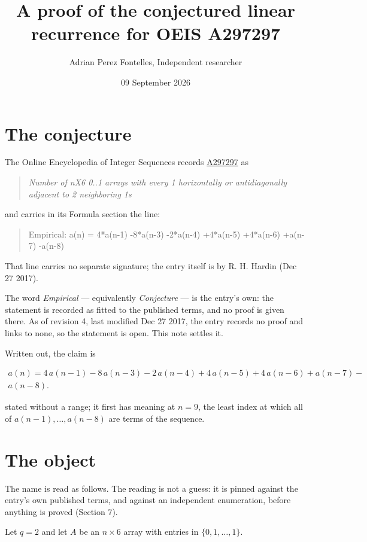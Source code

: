 \documentclass[11pt]{article}
\title{A proof of the conjectured linear recurrence for OEIS A297297}
\author{Adrian Perez Fontelles, Independent researcher}
\date{09 September 2026}
\theoremstyle{definition}
\begin{document}
\maketitle
\section{The conjecture}

The Online Encyclopedia of Integer Sequences records \href{https://oeis.org/A297297}{A297297} as

\begin{quote}\itshape Number of nX6 0..1 arrays with every 1 horizontally or antidiagonally adjacent to 2 neighboring 1s\end{quote}

and carries in its Formula section the line:

\begin{quote}\ttfamily Empirical: a(n) = 4*a(n-1) -8*a(n-3) -2*a(n-4) +4*a(n-5) +4*a(n-6) +a(n-7) -a(n-8)\end{quote}

That line carries no separate signature; the entry itself is by R. H. Hardin (Dec 27 2017).

The word {\itshape Empirical} --- equivalently {\itshape Conjecture} --- is the entry's own: the statement is recorded as fitted to the published terms, and no proof is given there. As of revision 4, last modified Dec 27 2017, the entry records no proof and links to none, so the statement is open. This note settles it.

Written out, the claim is

\begin{multline*} a(n) = 4\,a(n-1) - 8\,a(n-3) - 2\,a(n-4) + 4\,a(n-5) + 4\,a(n-6) + a(n-7) - \\ a(n-8). \end{multline*}

stated without a range; it first has meaning at $n = 9$, the least index at which all of $a(n-1),\dots,a(n-8)$ are terms of the sequence.

\section{The object}

The name is read as follows. The reading is not a guess: it is pinned against the entry's own published terms, and against an independent enumeration, before anything is proved (Section 7).

Let $q = 2$ and let $A$ be an $n \times 6$ array with entries in $\{0,1,\dots,1\}$.
\end{document}

